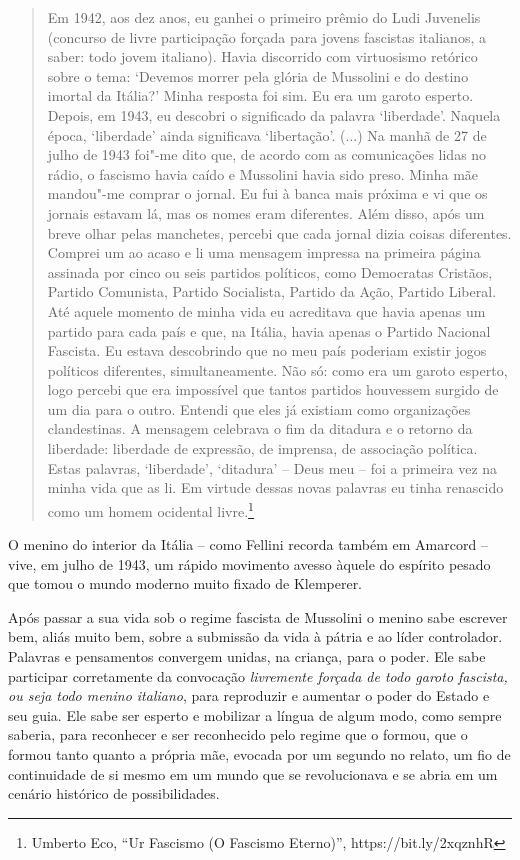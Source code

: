 \begin{quote}
Em 1942, aos dez anos, eu ganhei o primeiro prêmio do Ludi Juvenelis
(concurso de livre participação forçada para jovens fascistas italianos,
a saber: todo jovem italiano). Havia discorrido com virtuosismo retórico
sobre o tema: `Devemos morrer pela glória de Mussolini e do destino
imortal da Itália?' Minha resposta foi sim. Eu era um garoto esperto.
Depois, em 1943, eu descobri o significado da palavra `liberdade'.
Naquela época, `liberdade' ainda significava `libertação'. (...) Na
manhã de 27 de julho de 1943 foi"-me dito que, de acordo com as
comunicações lidas no rádio, o fascismo havia caído e Mussolini havia
sido preso. Minha mãe mandou"-me comprar o jornal. Eu fui à banca mais
próxima e vi que os jornais estavam lá, mas os nomes eram diferentes.
Além disso, após um breve olhar pelas manchetes, percebi que cada jornal
dizia coisas diferentes. Comprei um ao acaso e li uma mensagem impressa
na primeira página assinada por cinco ou seis partidos políticos, como
Democratas Cristãos, Partido Comunista, Partido Socialista, Partido da
Ação, Partido Liberal. Até aquele momento de minha vida eu acreditava
que havia apenas um partido para cada país e que, na Itália, havia
apenas o Partido Nacional Fascista. Eu estava descobrindo que no meu
país poderiam existir jogos políticos diferentes, simultaneamente. Não
só: como era um garoto esperto, logo percebi que era impossível que
tantos partidos houvessem surgido de um dia para o outro. Entendi que
eles já existiam como organizações clandestinas. A mensagem celebrava o
fim da ditadura e o retorno da liberdade: liberdade de expressão, de
imprensa, de associação política. Estas palavras, `liberdade',
`ditadura' -- Deus meu -- foi a primeira vez na minha vida que as li. Em
virtude dessas novas palavras eu tinha renascido como um homem ocidental
livre.\footnote{Umberto Eco, ``Ur Fascismo (O Fascismo Eterno)'',
  https://bit.ly/2xqznhR}
  \end{quote}

O menino do interior da Itália -- como Fellini recorda também em
Amarcord -- vive, em julho de 1943, um rápido movimento avesso àquele do
espírito pesado que tomou o mundo moderno muito fixado de Klemperer.

Após passar a sua vida sob o regime fascista de Mussolini o menino sabe
escrever bem, aliás muito bem, sobre a submissão da vida à pátria e ao
líder controlador. Palavras e pensamentos convergem unidas, na criança,
para o poder. Ele sabe participar corretamente da convocação
\emph{livremente forçada de todo garoto fascista, ou seja todo menino
italiano}, para reproduzir e aumentar o poder do Estado e seu guia. Ele
sabe ser esperto e mobilizar a língua de algum modo, como sempre
saberia, para reconhecer e ser reconhecido pelo regime que o formou, que
o formou tanto quanto a própria mãe, evocada por um segundo no relato,
um fio de continuidade de si mesmo em um mundo que se revolucionava e se
abria em um cenário histórico de possibilidades.

